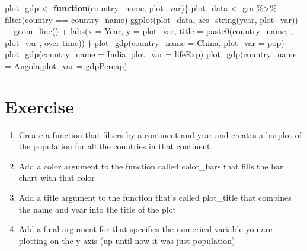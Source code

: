 \documentclass[
]{book}
\newenvironment{Shaded}{\begin{snugshade}}{\end{snugshade}}
\newcommand{\AttributeTok}[1]{\textcolor[rgb]{0.77,0.63,0.00}{#1}}
\newcommand{\ControlFlowTok}[1]{\textcolor[rgb]{0.13,0.29,0.53}{\textbf{#1}}}
\newcommand{\FunctionTok}[1]{\textcolor[rgb]{0.00,0.00,0.00}{#1}}
\newcommand{\NormalTok}[1]{#1}
\newcommand{\OtherTok}[1]{\textcolor[rgb]{0.56,0.35,0.01}{#1}}
\newcommand{\SpecialCharTok}[1]{\textcolor[rgb]{0.00,0.00,0.00}{#1}}
\newcommand{\StringTok}[1]{\textcolor[rgb]{0.31,0.60,0.02}{#1}}
\begin{document}
\begin{Shaded}
\begin{Highlighting}[]
\NormalTok{plot\_gdp }\OtherTok{\textless{}{-}} \ControlFlowTok{function}\NormalTok{(country\_name, plot\_var)\{}
\NormalTok{  plot\_data }\OtherTok{\textless{}{-}}\NormalTok{ gm }\SpecialCharTok{\%\textgreater{}\%} \FunctionTok{filter}\NormalTok{(country }\SpecialCharTok{==}\NormalTok{ country\_name) }
  \FunctionTok{ggplot}\NormalTok{(plot\_data, }\FunctionTok{aes\_string}\NormalTok{(}\StringTok{\textquotesingle{}year\textquotesingle{}}\NormalTok{, plot\_var)) }\SpecialCharTok{+} 
    \FunctionTok{geom\_line}\NormalTok{() }\SpecialCharTok{+}
    \FunctionTok{labs}\NormalTok{(}\AttributeTok{x =} \StringTok{\textquotesingle{}Year\textquotesingle{}}\NormalTok{, }\AttributeTok{y =}\NormalTok{ plot\_var, }\AttributeTok{title =} \FunctionTok{paste0}\NormalTok{(country\_name,}\StringTok{\textquotesingle{} \textquotesingle{}}\NormalTok{, plot\_var ,}\StringTok{\textquotesingle{} over time\textquotesingle{}}\NormalTok{))}
\NormalTok{\}}
\FunctionTok{plot\_gdp}\NormalTok{(}\AttributeTok{country\_name =} \StringTok{\textquotesingle{}China\textquotesingle{}}\NormalTok{, }\AttributeTok{plot\_var =} \StringTok{\textquotesingle{}pop\textquotesingle{}}\NormalTok{)}
\FunctionTok{plot\_gdp}\NormalTok{(}\AttributeTok{country\_name =} \StringTok{\textquotesingle{}India\textquotesingle{}}\NormalTok{, }\AttributeTok{plot\_var =} \StringTok{\textquotesingle{}lifeExp\textquotesingle{}}\NormalTok{)}
\FunctionTok{plot\_gdp}\NormalTok{(}\AttributeTok{country\_name =} \StringTok{\textquotesingle{}Angola\textquotesingle{}}\NormalTok{,}\AttributeTok{plot\_var =} \StringTok{\textquotesingle{}gdpPercap\textquotesingle{}}\NormalTok{)}
\end{Highlighting}
\end{Shaded}

\hypertarget{exercise}{%
\section*{Exercise}\label{exercise}}

\begin{enumerate}
\def\labelenumi{\arabic{enumi})}
\item
  Create a function that filters by a continent and year and creates a barplot of the population for all the countries in that continent
\item
  Add a color argument to the function called color\_bars that fills the bar chart with that color
\item
  Add a title argument to the function that's called plot\_title that combines the name and year into the title of the plot
\item
  Add a final argument for that specifies the numerical variable you are plotting on the y axis (up until now it was just population)
\end{enumerate}
\end{document}

